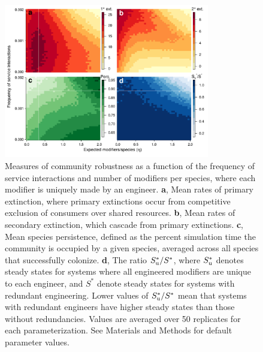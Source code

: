 \documentclass[twocolumn,preprintnumbers,amsmath,amssymb,superscriptaddress,linenumbers]{revtex4-1}
\begin{document}
\begin{figure}[h!]
\centering
\includegraphics[width=0.8\textwidth]{fig_engineers4_unique.pdf}
\caption{
Measures of community robustness as a function of the frequency of service interactions and number of modifiers per species, where each modifier is uniquely made by an engineer.
\textbf{a}, Mean rates of primary extinction, where primary extinctions occur from competitive exclusion of consumers over shared resources.
\textbf{b}, Mean rates of secondary extinction, which cascade from primary extinctions.
\textbf{c}, Mean species persistence, defined as the percent simulation time the community is occupied by a given species, averaged across all species that successfully colonize.
\textbf{d}, The ratio $S^*_{\rm u}/S^*$, where $S^*_{\rm u}$ denotes steady states for systems where all engineered modifiers are unique to each engineer, and $S^*$ denote steady states for systems with redundant engineering. Lower values of $S^*_{\rm u}/S^*$ mean that systems with redundant engineers have higher steady states than those without redundancies.
Values are averaged over 50 replicates for each parameterization.
See Materials and Methods for default parameter values.
}
\label{fig:unique}
\end{figure}
\end{document}
